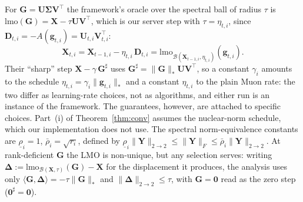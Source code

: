 \subsection{}

\paragraph{}
For $\mathbf{G} = \mathbf{U}\boldsymbol{\Sigma}\mathbf{V}^\top$ the framework's oracle over the spectral ball of radius $\tau$ is $\mathrm{lmo}(\mathbf{G}) = \mathbf{X} - \tau\mathbf{U}\mathbf{V}^\top$, which is our server step with $\tau = \eta_{t,i}$, since $\mathbf{D}_{t,i} = -A(\mathbf{g}_{t,i}) = \mathbf{U}_{t,i}\mathbf{V}_{t,i}^\top$:
\begin{equation}\label{eq:lmo_step_ours}
\mathbf{X}_{t,i} = \mathbf{X}_{t-1,i} - \eta_{t,i}\,\mathbf{D}_{t,i} = \mathrm{lmo}_{\mathcal{B}(\mathbf{X}_{t-1,i},\eta_{t,i})}(\mathbf{g}_{t,i}).
\end{equation}
Their ``sharp'' step $\mathbf{X} - \gamma\,\mathbf{G}^{\sharp}$ uses $\mathbf{G}^{\sharp} = \|\mathbf{G}\|_{*}\mathbf{U}\mathbf{V}^\top$, so a constant $\gamma_i$ amounts to the schedule $\eta_{t,i} = \gamma_i\|\mathbf{g}_{t,i}\|_{*}$ and a constant $\eta_{t,i}$ to the plain Muon rate: the two differ as learning-rate choices, not as algorithms, and either run is an instance of the framework. The guarantees, however, are attached to specific choices. Part~(i) of Theorem~\ref{thm:conv} assumes the nuclear-norm schedule, which our implementation does not use.  The spectral norm-equivalence constants are $\underline{\rho}_i = 1$, $\bar{\rho}_i = \sqrt{r_i}$, defined by $\underline{\rho}_i\|\mathbf{Y}\|_{2\to2}\le\|\mathbf{Y}\|_F\le\bar{\rho}_i\|\mathbf{Y}\|_{2\to2}$. At rank-deficient $\mathbf{G}$ the LMO is non-unique, but any selection serves: writing $\boldsymbol{\Delta} := \mathrm{lmo}_{\mathcal{B}(\mathbf{X},\tau)}(\mathbf{G}) - \mathbf{X}$ for the displacement it produces, the analysis uses only $\langle\mathbf{G},\boldsymbol{\Delta}\rangle = -\tau\|\mathbf{G}\|_{*}$ and $\|\boldsymbol{\Delta}\|_{2\to2}\le\tau$, with $\mathbf{G}=\mathbf{0}$ read as the zero step ($\mathbf{0}^{\sharp}=\mathbf{0}$).

